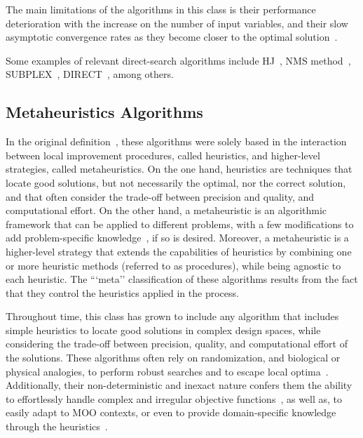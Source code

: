 	The main limitations of the algorithms in this class is their performance deterioration with the increase on the number of input variables, and their slow asymptotic convergence rates as they become closer to the optimal solution~\cite{Kolda2003}.

	Some examples of relevant direct-search algorithms include \ac{HJ}~\cite{Hooke1961}, \ac{NMS} method~\cite{Nelder1964}, SUBPLEX~\cite{Rowan1990}, \ac{DIRECT}~\cite{Jones1993DIRECT}, among others.
		
\subsection{Metaheuristics Algorithms}
\label{ssec:metaheuristics}

	In the original definition~\cite{Glover2003Metaheuristics}, these algorithms were solely based in the interaction between local improvement procedures, called heuristics, and higher-level strategies, called metaheuristics. On the one hand, heuristics are techniques that locate good solutions, but not necessarily the optimal, nor the correct solution, and that often consider the trade-off between precision and quality, and computational effort. On the other hand, a metaheuristic is an algorithmic framework that can be applied to different problems, with a few modifications to add problem-specific knowledge~\cite{Glover2003Metaheuristics}, if so is desired. Moreover, a metaheuristic is a higher-level strategy that extends the capabilities of heuristics by combining one or more heuristic methods (referred to as procedures), while being agnostic to each heuristic. The ```meta'' classification of these algorithms results from the fact that they control the heuristics applied in the process.

	Throughout time, this class has grown to include any algorithm that includes simple heuristics to locate good solutions in complex design spaces, while considering the trade-off between precision, quality, and computational effort of the solutions. These algorithms often rely on randomization, and biological or physical analogies, to perform robust searches and to escape local optima~\cite{Glover2003Metaheuristics, Wortmann2016BBO}. Additionally, their non-deterministic and inexact nature confers them the ability to effortlessly handle complex and irregular objective functions~\cite{Wortmann2017GABESTCHOICE}, as well as, to easily adapt to \ac{MOO} contexts, or even to provide domain-specific knowledge through the heuristics~\cite{Wortmann2017GABESTCHOICE}.
	
